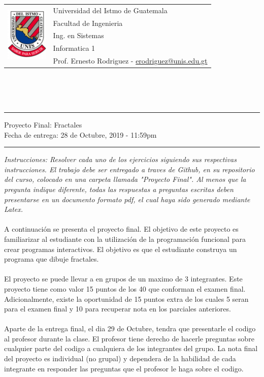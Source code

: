 \documentclass{article}
\newcommand{\horrule}[1]{\rule{\linewidth}{#1}}
\begin{document}
\begin{tabular}{l l}
\multirow{5}{*}{\includegraphics[width=2cm]{../recursos/logo.png}} & Universidad del Istmo de Guatemala \\
 & Facultad de Ingenieria \\
 & Ing. en Sistemas \\
 & Informatica 1 \\
 & Prof. Ernesto Rodriguez - \href{mailto:erodriguez@unis.edu.gt}{erodriguez@unis.edu.gt} \\
\end{tabular}
\\\\\\

\begin{center}
        \horrule{0.5pt}
        \huge{Proyecto Final: Fractales} \\
        \large{Fecha de entrega: 28 de Octubre, 2019 - 11:59pm} \\
        \horrule{1pt}
\end{center}

\emph{Instrucciones: Resolver cada uno de los ejercicios siguiendo sus respectivas
instrucciones. El trabajo debe ser entregado a traves de Github, en su repositorio del curso, colocado en una carpeta llamada "Proyecto Final".
Al menos que la pregunta indique diferente, todas las respuestas a preguntas escritas deben presentarse en
un documento formato pdf, el cual haya sido generado mediante Latex. }
\\\\
A continuaci\'on se presenta el proyecto final. El objetivo de este proyecto es familiarizar al
estudiante con la utilizaci\'on de la programaci\'on funcional para crear programas interactivos.
El objetivo es que el estudiante construya un programa que dibuje fractales.
\\\\
El proyecto se puede llevar a en grupos de un maximo de 3 integrantes. Este proyecto tiene como valor 15 puntos
de los 40 que conforman el examen final. Adicionalmente, existe la oportunidad de 15 puntos extra de los cuales 5
seran para el examen final y 10 para recuperar nota en los parciales anteriores.
\\\\
Aparte de la entrega final, el dia 29 de Octubre, tendra que presentarle el codigo
al profesor durante la clase. El profesor tiene derecho de hacerle preguntas sobre
cualquier parte del codigo a cualquiera de los integrantes del grupo. La nota final
del proyecto es individual (no grupal) y dependera de la habilidad de cada integrante
en responder las preguntas que el profesor le haga sobre el codigo.
\end{document}
